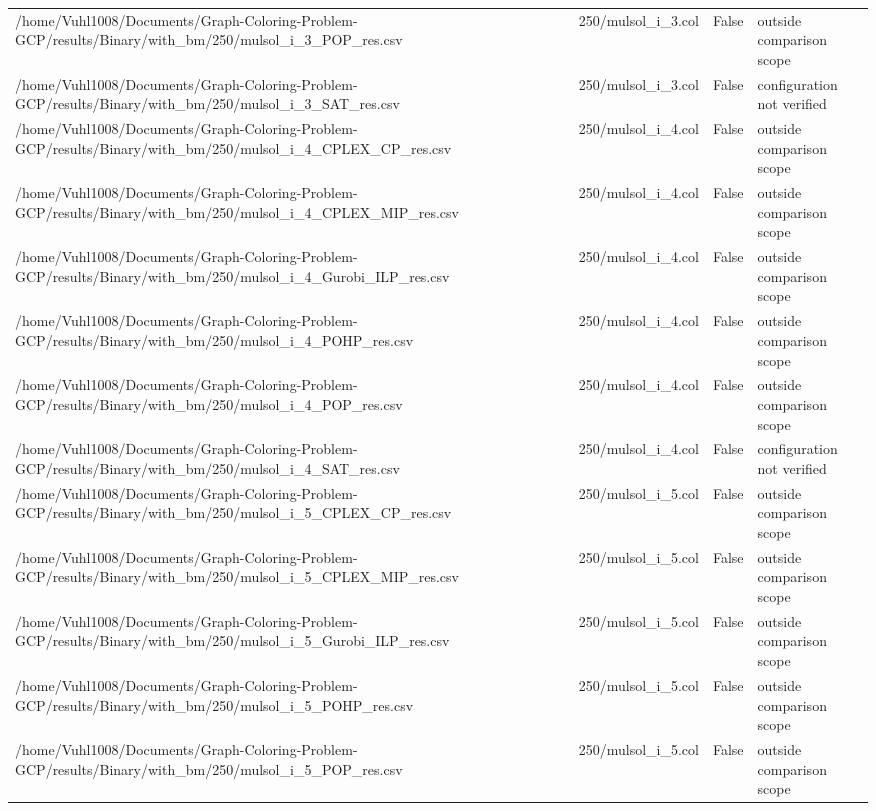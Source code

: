 \begin{table}[htbp]
\begin{tabular}{llll}
/home/Vuhl1008/Documents/Graph-Coloring-Problem-GCP/results/Binary/with\_bm/250/mulsol\_i\_3\_POP\_res.csv & 250/mulsol\_i\_3.col & False & outside comparison scope \\
/home/Vuhl1008/Documents/Graph-Coloring-Problem-GCP/results/Binary/with\_bm/250/mulsol\_i\_3\_SAT\_res.csv & 250/mulsol\_i\_3.col & False & configuration not verified \\
/home/Vuhl1008/Documents/Graph-Coloring-Problem-GCP/results/Binary/with\_bm/250/mulsol\_i\_4\_CPLEX\_CP\_res.csv & 250/mulsol\_i\_4.col & False & outside comparison scope \\
/home/Vuhl1008/Documents/Graph-Coloring-Problem-GCP/results/Binary/with\_bm/250/mulsol\_i\_4\_CPLEX\_MIP\_res.csv & 250/mulsol\_i\_4.col & False & outside comparison scope \\
/home/Vuhl1008/Documents/Graph-Coloring-Problem-GCP/results/Binary/with\_bm/250/mulsol\_i\_4\_Gurobi\_ILP\_res.csv & 250/mulsol\_i\_4.col & False & outside comparison scope \\
/home/Vuhl1008/Documents/Graph-Coloring-Problem-GCP/results/Binary/with\_bm/250/mulsol\_i\_4\_POHP\_res.csv & 250/mulsol\_i\_4.col & False & outside comparison scope \\
/home/Vuhl1008/Documents/Graph-Coloring-Problem-GCP/results/Binary/with\_bm/250/mulsol\_i\_4\_POP\_res.csv & 250/mulsol\_i\_4.col & False & outside comparison scope \\
/home/Vuhl1008/Documents/Graph-Coloring-Problem-GCP/results/Binary/with\_bm/250/mulsol\_i\_4\_SAT\_res.csv & 250/mulsol\_i\_4.col & False & configuration not verified \\
/home/Vuhl1008/Documents/Graph-Coloring-Problem-GCP/results/Binary/with\_bm/250/mulsol\_i\_5\_CPLEX\_CP\_res.csv & 250/mulsol\_i\_5.col & False & outside comparison scope \\
/home/Vuhl1008/Documents/Graph-Coloring-Problem-GCP/results/Binary/with\_bm/250/mulsol\_i\_5\_CPLEX\_MIP\_res.csv & 250/mulsol\_i\_5.col & False & outside comparison scope \\
/home/Vuhl1008/Documents/Graph-Coloring-Problem-GCP/results/Binary/with\_bm/250/mulsol\_i\_5\_Gurobi\_ILP\_res.csv & 250/mulsol\_i\_5.col & False & outside comparison scope \\
/home/Vuhl1008/Documents/Graph-Coloring-Problem-GCP/results/Binary/with\_bm/250/mulsol\_i\_5\_POHP\_res.csv & 250/mulsol\_i\_5.col & False & outside comparison scope \\
/home/Vuhl1008/Documents/Graph-Coloring-Problem-GCP/results/Binary/with\_bm/250/mulsol\_i\_5\_POP\_res.csv & 250/mulsol\_i\_5.col & False & outside comparison scope \\

\end{tabular}
\end{table}
